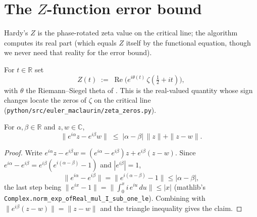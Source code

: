 \section{The \texorpdfstring{$Z$}{Z}-function error bound}
\label{sec:hz_Z}

Hardy's $Z$ is the phase-rotated zeta value on the critical line; the algorithm
computes its real part (which equals $Z$ itself by the functional equation, though we
never need that reality for the error bound).

\begin{definition}
\label{def:hz_Z}
\leanok
{}
For $t\in\mathbb{R}$ set
\[
  Z(t)\;:=\;\operatorname{Re}\bigl(e^{i\theta(t)}\,\zeta(\tfrac12+it)\bigr),
\]
with $\theta$ the Riemann--Siegel theta of . This is the
real-valued quantity whose sign changes locate the zeros of $\zeta$ on the critical
line (\texttt{python/src/euler\_maclaurin/zeta\_zeros.py}).
\end{definition}

\begin{lemma}
\label{lem:hz_phase}
\leanok
For $\alpha,\beta\in\mathbb{R}$ and $z,w\in\mathbb{C}$,
\[
  \bigl\|e^{i\alpha}z-e^{i\beta}w\bigr\|\;\le\;\lvert\alpha-\beta\rvert\,\|z\|+\|z-w\|.
\]
\end{lemma}

\begin{proof}
\leanok
Write $e^{i\alpha}z-e^{i\beta}w=(e^{i\alpha}-e^{i\beta})z+e^{i\beta}(z-w)$.
Since $e^{i\alpha}-e^{i\beta}=e^{i\beta}(e^{i(\alpha-\beta)}-1)$ and $|e^{i\beta}|=1$,
\[
  \bigl\|e^{i\alpha}-e^{i\beta}\bigr\|=\bigl\|e^{i(\alpha-\beta)}-1\bigr\|\le\lvert\alpha-\beta\rvert,
\]
the last step being $\|e^{ix}-1\|=\bigl\|\int_0^x i\,e^{iu}\,du\bigr\|\le|x|$ (mathlib's
\texttt{Complex.norm\_exp\_ofReal\_mul\_I\_sub\_one\_le}). Combining
with $\|e^{i\beta}(z-w)\|=\|z-w\|$ and the triangle inequality gives the claim.
\end{proof}

